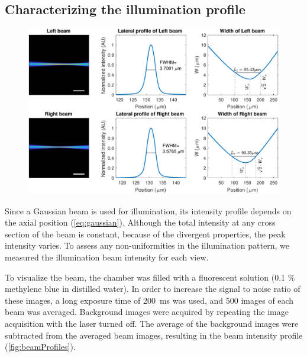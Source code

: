     

  \subsection{Characterizing the illumination profile}

    \begin{figure}[bthp]
      \centering
      \includegraphics[width=\textwidth]{beamPlots.pdf}
      \label{fig:beamProfiles}
    \end{figure}

    Since a Gaussian beam is used for illumination, its intensity profile depends on the axial position (\autoref{eq:gaussian}). Although the total intensity at any cross section of the beam is constant, because of the divergent properties, the peak intensity varies. To assess any non-uniformities in the illumination pattern, we measured the illumination beam intensity for each view.

    To visualize the beam, the chamber was filled with a fluorescent solution (0.1 \% methylene blue in distilled water). In order to increase the signal to noise ratio of these images, a long exposure time of \SI{200}{ms} was used, and 500 images of each beam was averaged. Background images were acquired by repeating the image acquisition with the laser turned off. The average of the background images were subtracted from the averaged beam images, resulting in the beam intensity profile (\autoref{fig:beamProfiles}).

